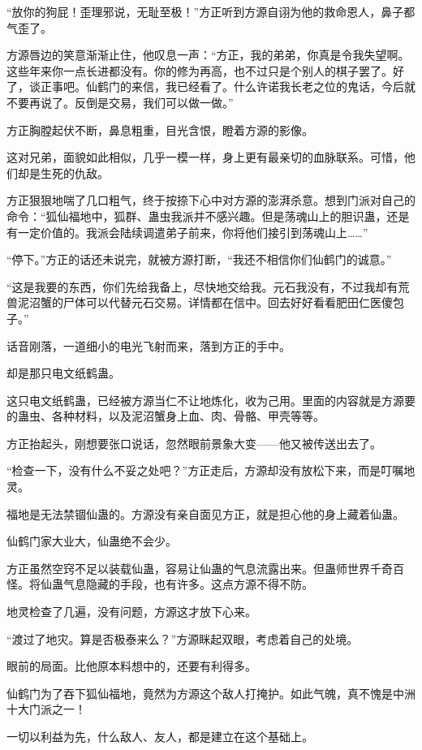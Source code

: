\begin{this_body}
“放你的狗屁！歪理邪说，无耻至极！”方正听到方源自诩为他的救命恩人，鼻子都气歪了。

方源唇边的笑意渐渐止住，他叹息一声：“方正，我的弟弟，你真是令我失望啊。这些年来你一点长进都没有。你的修为再高，也不过只是个别人的棋子罢了。好了，谈正事吧。仙鹤门的来信，我已经看了。什么许诺我长老之位的鬼话，今后就不要再说了。反倒是交易，我们可以做一做。”

方正胸膛起伏不断，鼻息粗重，目光含恨，瞪着方源的影像。

这对兄弟，面貌如此相似，几乎一模一样，身上更有最亲切的血脉联系。可惜，他们却是生死的仇敌。

方正狠狠地喘了几口粗气，终于按捺下心中对方源的澎湃杀意。想到门派对自己的命令：“狐仙福地中，狐群、蛊虫我派并不感兴趣。但是荡魂山上的胆识蛊，还是有一定价值的。我派会陆续调遣弟子前来，你将他们接引到荡魂山上……”

“停下。”方正的话还未说完，就被方源打断，“我还不相信你们仙鹤门的诚意。”

“这是我要的东西，你们先给我备上，尽快地交给我。元石我没有，不过我却有荒兽泥沼蟹的尸体可以代替元石交易。详情都在信中。回去好好看看肥田仁医傻包子。”

话音刚落，一道细小的电光飞射而来，落到方正的手中。

却是那只电文纸鹤蛊。

这只电文纸鹤蛊，已经被方源当仁不让地炼化，收为己用。里面的内容就是方源要的蛊虫、各种材料，以及泥沼蟹身上血、肉、骨骼、甲壳等等。

方正抬起头，刚想要张口说话，忽然眼前景象大变——他又被传送出去了。

“检查一下，没有什么不妥之处吧？”方正走后，方源却没有放松下来，而是叮嘱地灵。

福地是无法禁锢仙蛊的。方源没有亲自面见方正，就是担心他的身上藏着仙蛊。

仙鹤门家大业大，仙蛊绝不会少。

方正虽然空窍不足以装载仙蛊，容易让仙蛊的气息流露出来。但蛊师世界千奇百怪。将仙蛊气息隐藏的手段，也有许多。这点方源不得不防。

地灵检查了几遍，没有问题，方源这才放下心来。

“渡过了地灾。算是否极泰来么？”方源眯起双眼，考虑着自己的处境。

眼前的局面。比他原本料想中的，还要有利得多。

仙鹤门为了吞下狐仙福地，竟然为方源这个敌人打掩护。如此气魄，真不愧是中洲十大门派之一！

一切以利益为先，什么敌人、友人，都是建立在这个基础上。


\end{this_body}
